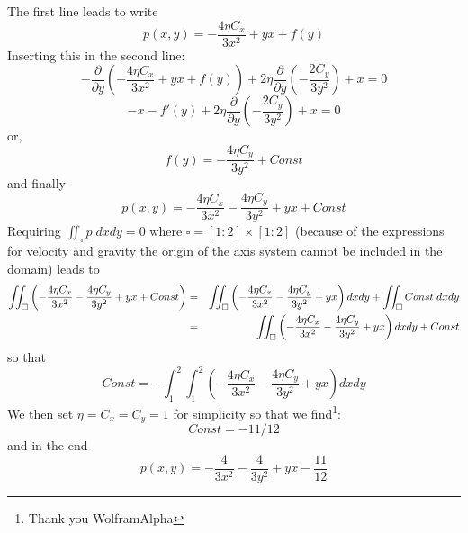 The first line leads to write 
\[
p(x,y) = -\frac{4 \eta C_x}{3x^2}   + yx + f(y)
\]
Inserting this in the second line:
\[
-\frac{\partial }{\partial y}  \left( -\frac{4 \eta C_x}{3x^2}   + yx + f(y) \right) 
+ 2\eta \frac{\partial}{\partial y} \left(-\frac{2C_y}{3y^2} \right)+ x = 0
\]
\[
-x - f'(y) + 2\eta \frac{\partial}{\partial y} \left(-\frac{2C_y}{3y^2} \right)+ x = 0
\]
or, 
\[
f(y) =   -\frac{4 \eta C_y}{3y^2} + Const
\]
and finally
\[
p(x,y) =  -\frac{4 \eta C_x}{3x^2}  -\frac{4 \eta C_y}{3y^2}   + yx    + Const 
\]
Requiring $\iint_\square p \; dxdy=0$ where $\square=[1:2]\times [1:2]$ (because of the 
expressions for velocity and gravity the origin of the axis system cannot be included in the 
domain) leads to 
\begin{eqnarray}
\iint_\square  
\left( -\frac{4 \eta C_x}{3x^2}  -\frac{4 \eta C_y}{3y^2}   + yx    + Const \right) 
&=& 
\iint_\square   \left( -\frac{4 \eta C_x}{3x^2}  -\frac{4 \eta C_y}{3y^2}   + yx  \right) dxdy
+\iint_\square   Const \; dx dy \nonumber\\
&=&\iint_\square   \left( -\frac{4 \eta C_x}{3x^2}  -\frac{4 \eta C_y}{3y^2}   + yx  \right) dxdy
+ Const
\end{eqnarray}
so that 
\[
Const = -\int_1^2 \int_1^2  \left( -\frac{4 \eta C_x}{3x^2}  -\frac{4 \eta C_y}{3y^2}   + yx  \right) dxdy
\]
We then set $\eta=C_x=C_y=1$ for simplicity so that we find\footnote{Thank you WolframAlpha}:
\[
Const= -11/12
\]
and in the end
\[
p(x,y) = -\frac{4}{3x^2} -\frac{4}{3y^2} + yx -\frac{11}{12}
\]

